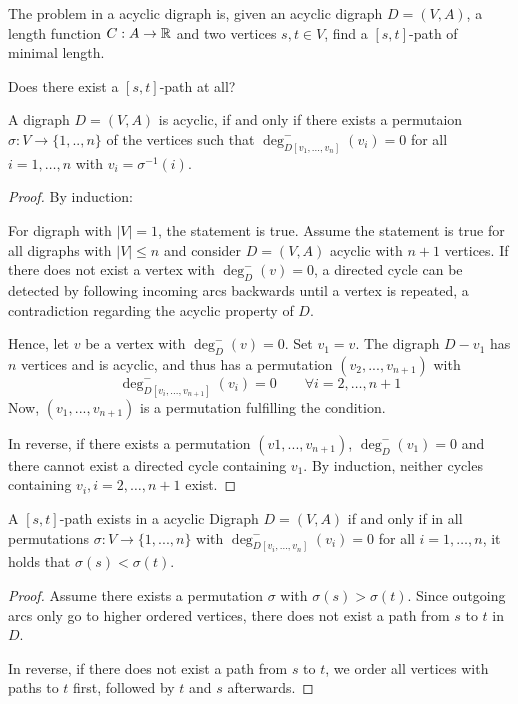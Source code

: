 
\begin{defn}
	The  problem in a acyclic digraph is, given an acyclic digraph $D=(V,A)$, a length function $C: A\rightarrow \mathbb{R}$ and two vertices $s,t\in V$, find a $[s,t]$-path of minimal length.
\end{defn}

\begin{qstn}
Does there exist a $[s,t]$-path at all?
\end{qstn}
\begin{thm}
A digraph $D = (V, A)$ is acyclic, if and only if there exists a permutaion $\sigma : V \rightarrow \{ 1, .., n \}$ of the vertices such that $\deg^-_{D [v_1, ...,  v_n]} (v_i) = 0$ for all $i = 1, …, n$ with $v_i = \sigma^{-1}(i)$.
\end{thm}
\begin{proof}
By induction:

For digraph with $| V |=1$, the statement is true. Assume the statement is true for all digraphs with $|V| \leq n$ and consider $D = (V, A)$ acyclic with $n+1$ vertices. 
If there does not exist a vertex with $\deg_D^-(v) = 0$, a directed cycle can be detected by following incoming arcs backwards until a vertex is repeated, a contradiction regarding the acyclic property of $D$.

Hence, let $v$ be a vertex with $\deg^-_D(v)=0$. Set $v_1 = v$. The digraph $D - v_1$ has $n$ vertices and is acyclic, and thus has a permutation $(v_2, ..., v_{n+1})$ with
\[ \deg^-_{D[v_i, ..., v_{n+1}]}(v_i) = 0 \qquad \forall i = 2, …, n+1 \]
Now, $(v_1, ..., v_{n+1})$ is a permutation fulfilling the condition.

In reverse, if there exists a permutation $(v1, ..., v_{n+1})$, $\deg^-_D(v_1) = 0$ and there cannot exist a directed cycle containing $v_1$. By induction, neither cycles containing $v_i, i = 2, …, n+1$ exist.
\end{proof}

\begin{thm}
A $[s,t]$-path exists in a acyclic Digraph $D = (V, A)$ if and only if in all permutations $\sigma: V \rightarrow \{ 1, ..., n\}$ with $\deg^-_{D[v_i, …, v_n]}(v_i) = 0$ for all $i = 1, …, n$, it holds that $\sigma(s) < \sigma(t)$.
\end{thm}
\begin{proof}
Assume there exists a permutation $\sigma$ with $\sigma(s) > \sigma(t)$. Since outgoing arcs only go to higher ordered vertices, there does not exist a path from $s$ to $t$ in $D$.

In reverse, if there does not exist a path from $s$ to $t$, we order all vertices with paths to $t$ first, followed by $t$ and $s$ afterwards. 
\end{proof}

